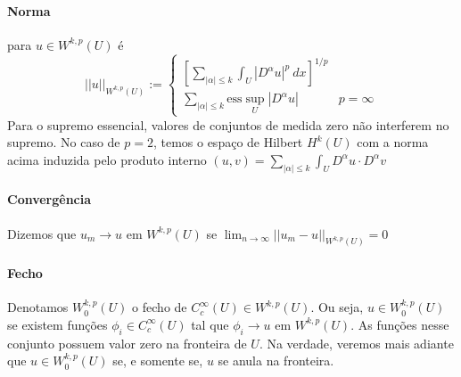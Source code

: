 \documentclass[11pt]{article}
\newcommand{\R}{\mathbb{R}}
\begin{document}
\paragraph{Norma} para \( u \in W^{k,p}(U) \) é \[ ||u||_{W^{k,p}(U)} := \begin{cases}
	\left[ \sum_{|\alpha|\leq k} \int_U \left| D^{\alpha} u\right|^p\ dx  \right]^{1/p}\\
	\sum_{|\alpha|\leq k} \text{ess}\sup_U \left| D^{\alpha} u \right| & p=\infty
\end{cases}\]Para o supremo essencial, valores de conjuntos de medida zero não interferem no supremo. No caso de \( p=2 \), temos o espaço de Hilbert \( H^k(U) \) com a norma acima induzida pelo produto interno \( (u,v) =\sum_{|\alpha|\leq k} \int_U D^{\alpha}u \cdot D^\alpha v   \)

\paragraph{Convergência} Dizemos que \( u_m \rightarrow u\) em \( W^{k,p}(U) \) se \( \lim_{n\rightarrow \infty} ||u_m - u||_{W^{k,p}(U)} =0\)

\paragraph{Fecho} Denotamos \( W^{k,p}_0 (U) \) o fecho de \( C^{\infty}_c(U) \in W^{k,p}(U) \). Ou seja, \( u \in W^{k,p}_0(U) \) se existem funções \( \phi_i \in C^{\infty}_c(U) \) tal que \( \phi_i \rightarrow u \) em \( W^{k,p}(U) \). As funções nesse conjunto possuem valor zero na fronteira de \( U \). Na verdade, veremos mais adiante que $u \in  W^{k,p}_0 (U)$ se, e somente se, $u$ se anula na fronteira.

\end{document}
